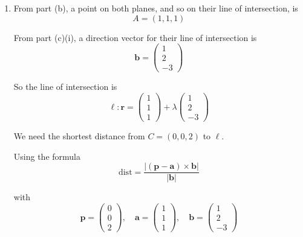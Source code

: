 \documentclass[leqno]{article}
\begin{document}
\begin{enumerate}[
  label=\textbf{\arabic*.},
  leftmargin=*,
  topsep=0pt,
  partopsep=0pt,
  parsep=0pt
]
\begin{djsSolution}
\begin{enumerate}[label=\textbf{(\alph*)}]
\begin{enumerate}[label=(\roman*)]
From part (c)(i), $\mathbf n_1\times\mathbf n_2=\mathbf i+2\mathbf j-3\mathbf k$, so
\begin{align*}
\left\lvert \mathbf n_1\times \mathbf n_2\right\rvert&=\sqrt{1^2+2^2+(-3)^2}=\sqrt{14} \\
\left\lvert \mathbf n_1\right\rvert&=\sqrt{1^2+1^2+1^2}=\sqrt{3} \\
\left\lvert \mathbf n_2\right\rvert&=\sqrt{2^2+(-1)^2+0^2}=\sqrt{5}
\end{align*}

So
\[
\sin\theta=\frac{\sqrt{14}}{\sqrt{3}\sqrt{5}}=\sqrt{\frac{14}{15}}
\]

Hence
\[
\theta=\arcsin\left(\sqrt{\frac{14}{15}}\right)\approx 75.0^\circ
\]

The acute angle between the planes is $\arcsin\left(\sqrt{\frac{14}{15}}\right)\approx 75.0^\circ$.

    \item From part (b), a point on both planes, and so on their line of intersection, is
\[
A=(1,1,1)
\]

From part (c)(i), a direction vector for their line of intersection is
\[
\mathbf b=\begin{pmatrix}1\\2\\-3\end{pmatrix}
\]

So the line of intersection is
\[
\ell:\mathbf r=\begin{pmatrix}1\\1\\1\end{pmatrix}+\lambda\begin{pmatrix}1\\2\\-3\end{pmatrix}
\]

We need the shortest distance from $C=(0,0,2)$ to $\ell$.

Using the formula
\[
\mathrm{dist}
=\frac{\left\lvert(\mathbf p-\mathbf a)\times\mathbf b\right\rvert}{\left\lvert\mathbf b\right\rvert}
\]

with
\[
\mathbf p=\begin{pmatrix}0\\0\\2\end{pmatrix},\quad \mathbf a=\begin{pmatrix}1\\1\\1\end{pmatrix},\quad \mathbf b=\begin{pmatrix}1\\2\\-3\end{pmatrix}
\]


\end{enumerate}
\end{enumerate}
\end{djsSolution}
\end{enumerate}
\end{document}
